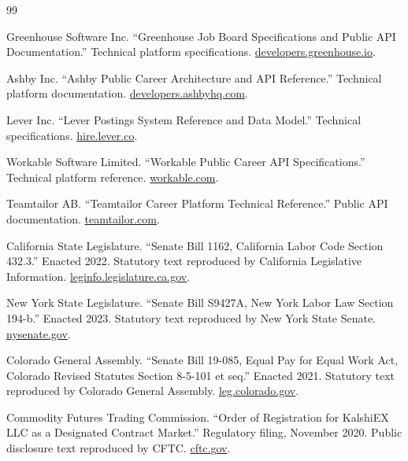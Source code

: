 \documentclass{article}
\begin{document}
\clearpage
\begingroup
\small
\renewcommand{\refname}{References}
\begin{thebibliography}{99}
\raggedright

Greenhouse Software Inc. ``Greenhouse Job Board Specifications and Public API Documentation.'' Technical platform specifications. \href{https://developers.greenhouse.io}{developers.greenhouse.io}.

Ashby Inc. ``Ashby Public Career Architecture and API Reference.'' Technical platform documentation. \href{https://developers.ashbyhq.com}{developers.ashbyhq.com}.

Lever Inc. ``Lever Postings System Reference and Data Model.'' Technical specifications. \href{https://hire.lever.co}{hire.lever.co}.

Workable Software Limited. ``Workable Public Career API Specifications.'' Technical platform reference. \href{https://workable.com}{workable.com}.

Teamtailor AB. ``Teamtailor Career Platform Technical Reference.'' Public API documentation. \href{https://teamtailor.com}{teamtailor.com}.

California State Legislature. ``Senate Bill 1162, California Labor Code Section 432.3.'' Enacted 2022. Statutory text reproduced by California Legislative Information. \href{https://leginfo.legislature.ca.gov}{leginfo.legislature.ca.gov}.

New York State Legislature. ``Senate Bill S9427A, New York Labor Law Section 194-b.'' Enacted 2023. Statutory text reproduced by New York State Senate. \href{https://nysenate.gov}{nysenate.gov}.

Colorado General Assembly. ``Senate Bill 19-085, Equal Pay for Equal Work Act, Colorado Revised Statutes Section 8-5-101 et seq.'' Enacted 2021. Statutory text reproduced by Colorado General Assembly. \href{https://leg.colorado.gov}{leg.colorado.gov}.

Commodity Futures Trading Commission. ``Order of Registration for KalshiEX LLC as a Designated Contract Market.'' Regulatory filing, November 2020. Public disclosure text reproduced by CFTC. \href{https://cftc.gov}{cftc.gov}.

\end{thebibliography}
\endgroup
\end{document}
